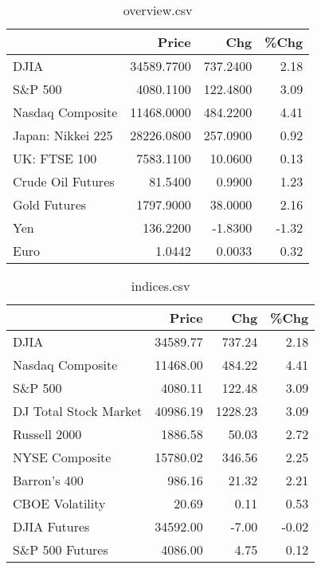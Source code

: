 \documentclass{article}%
\begin{document}
\begin{table}[htbp]%
\caption{overview.csv}%
\centering%
\begin{adjustbox}{width=1\textwidth}%
\begin{tabular}{lrrr}
\toprule
                  &      Price &      Chg &  \%Chg \\
\midrule
             DJIA & 34589.7700 & 737.2400 &  2.18 \\
          S\&P 500 &  4080.1100 & 122.4800 &  3.09 \\
 Nasdaq Composite & 11468.0000 & 484.2200 &  4.41 \\
Japan: Nikkei 225 & 28226.0800 & 257.0900 &  0.92 \\
     UK: FTSE 100 &  7583.1100 &  10.0600 &  0.13 \\
Crude Oil Futures &    81.5400 &   0.9900 &  1.23 \\
     Gold Futures &  1797.9000 &  38.0000 &  2.16 \\
              Yen &   136.2200 &  -1.8300 & -1.32 \\
             Euro &     1.0442 &   0.0033 &  0.32 \\
\bottomrule
\end{tabular}
%
\end{adjustbox}%
\end{table}

%


\begin{table}[htbp]%
\caption{indices.csv}%
\centering%
\begin{adjustbox}{width=1\textwidth}%
\begin{tabular}{lrrr}
\toprule
                      &    Price &     Chg &  \%Chg \\
\midrule
                 DJIA & 34589.77 &  737.24 &  2.18 \\
     Nasdaq Composite & 11468.00 &  484.22 &  4.41 \\
              S\&P 500 &  4080.11 &  122.48 &  3.09 \\
DJ Total Stock Market & 40986.19 & 1228.23 &  3.09 \\
         Russell 2000 &  1886.58 &   50.03 &  2.72 \\
       NYSE Composite & 15780.02 &  346.56 &  2.25 \\
         Barron's 400 &   986.16 &   21.32 &  2.21 \\
      CBOE Volatility &    20.69 &    0.11 &  0.53 \\
         DJIA Futures & 34592.00 &   -7.00 & -0.02 \\
      S\&P 500 Futures &  4086.00 &    4.75 &  0.12 \\
\bottomrule
\end{tabular}
%
\end{adjustbox}%
\end{table}
\end{document}
